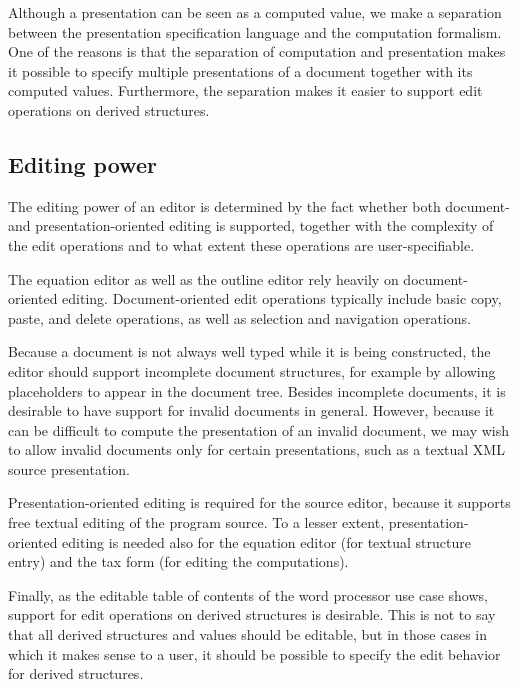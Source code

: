 \documentclass{entcs}
\begin{document}
Although a presentation can be seen as a computed value, we make a separation between the presentation specification language and the computation formalism. One of the reasons is that the separation of computation and presentation makes it possible to specify multiple presentations of a document together with its computed values. Furthermore, the separation makes it easier to support edit operations on derived structures.


%																
\subsection{Editing power} \label{sect:editingPower}

The editing power of an editor is determined by the fact whether both document- and presentation-oriented editing is supported, together with the complexity of the edit operations and to what extent these operations are user-specifiable. 



The equation editor as well as the outline editor rely heavily on document-oriented editing. Document-oriented edit operations typically include basic copy, paste, and delete operations, as well as selection and navigation operations.

Because a document is not always well typed while it is being constructed, the editor should support incomplete document structures, for example by allowing placeholders to appear in the document tree. Besides incomplete documents, it is desirable to have support for invalid documents in general. However, because it can be difficult to compute the presentation of an invalid document, we may wish to allow invalid documents only for certain presentations, such as a textual XML source presentation. 

Presentation-oriented editing is required for the source editor, because it supports free textual editing of the program source. To a lesser extent, presentation-oriented editing is needed also for the equation editor (for textual structure entry) and the tax form (for editing the computations). 

Finally, as the editable table of contents of the word processor use case shows, support for edit operations on derived structures is desirable. This is not to say that all derived structures and values should be editable, but in those cases in which it makes sense to a user, it should be possible to specify the edit behavior for derived structures.
\end{document}
